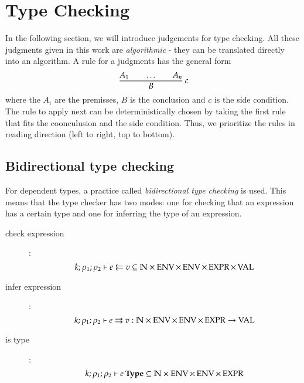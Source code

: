 \section{Type Checking}

\renewcommand\Check[5]{#1;#2;#3\vdash#4\leftleftarrows#5}
\newcommand\IsType[4]{#1;#2;#3\vdash#4\:\mathbf{Type}}
\newcommand\DataType[5]{#1;#2;#3;#4\vdash#5\:\mathbf{Data Type}}
\newcommand\ConType[5]{#1;#2;#3;#4\vdash#5\:\mathbf{Con Type}}
\newcommand\Infer[5]{#1;#2;#3\vdash#4\rightrightarrows#5}
\newcommand\EqVal[4]{#1;#2\vdash#3\Leftrightarrow#4}
\newcommand\FeqVal[4]{#1;#2\vdash#3{\:\leftrightarrow\:}#4}
\newcommand\DeqVal[2]{\vdash#1\leftrightarrow#2}
\newcommand\LeqVal[4]{#1;#2;\vdash#3\leq#4}
\newcommand\FleqVal[4]{#1;#2\vdash#3{\:\ll\:}#4}
\newcommand\DLeqVal[2]{\vdash#1\leq#2}
\newcommand\SzLeq[2]{\vdash#1\sqsubseteq#2}

In the following section, we will introduce judgements for type checking.
All these judgments given in this work are \emph{algorithmic} - they can be translated directly into an
algorithm.
A rule for a judgments has the general form
\[
\ \dfrac{A_1 \qquad \ldots \qquad A_n}{B}
{\: c}
\]
\noindent where the $A_i$ are the premisses, $B$ is the conclusion and $c$ is the side condition.
The rule to apply next can be deterministically chosen by taking the first rule that fits the coonculusion and the side condition. Thus, we prioritize the rules in reading direction (left to right, top to bottom).
\subsection{Bidirectional type checking} 
For dependent types, a practice called \emph{bidirectional type checking} is used.
This means that the type checker has two modes:
one for checking that an expression has a certain type and one for inferring the type of an expression.

\begin{description}
\item[check expression]:
\[\Check{k}{\rho_1}{\rho_2}{e}{v} \subseteq \cN \times \Env \times \Env \times \Expr \times \Val\]
\item[infer expression]:
\[\Infer{k}{\rho_1}{\rho_2}{e}{v} : \cN \times \Env \times \Env \times \Expr \ra \Val\]
\item[is type]:
\[\IsType{k}{\rho_1}{\rho_2}{e} \subseteq \cN \times \Env \times \Env \times \Expr \]
\end{description}

